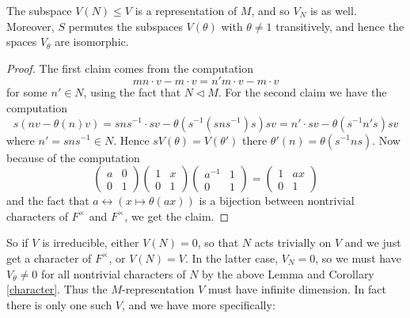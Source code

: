\begin{lemma}
	The subspace $V(N) \leq V$ is a representation of $M$, and so $V_N$ is as well. Moreover, $S$ permutes the subspaces $V(\theta)$ with $\theta \not= 1$ transitively, and hence the spaces $V_\theta$ are isomorphic.
\end{lemma}
\begin{proof}
	The first claim comes from the computation 
	$$mn\cdot v - m\cdot v = n'm\cdot v - m\cdot v$$ for some $n' \in N$, using the fact that $N \lhd M$. For the second claim we have the computation
	\[s(nv - \theta(n)v) = sns^{-1}\cdot sv - \theta (s^{-1}(sns^{-1})s)sv = n'\cdot sv - \theta(s^{-1}n's) sv\]
	where $n' = sns^{-1}\in N$. Hence $sV(\theta) = V(\theta')$ there $\theta'(n) = \theta(s^{-1}ns)$. Now because of the computation
	\[\begin{pmatrix}
		a & 0 \\ 0 & 1
	\end{pmatrix}\begin{pmatrix}
		1 & x \\ 0 & 1
	\end{pmatrix}\begin{pmatrix}
		a^{-1} & 1 \\ 0 & 1
	\end{pmatrix} = \begin{pmatrix}
		1 & ax \\ 0 & 1
	\end{pmatrix}\]
	and the fact that $a \leftrightarrow (x\mapsto\theta(ax))$ is a bijection between nontrivial characters of $F^\times$ and $F^\times$, we get the claim.
\end{proof}

So if $V$ is irreducible, either $V(N)=0$, so that $N$ acts trivially on $V$ and we just get a character of $F^\times$, or $V(N)=V$. In the latter case, $V_N=0$, so we must have $V_\theta \neq 0$ for all nontrivial characters of $N$ by the above Lemma and Corollary \ref{character}. Thus the $M$-representation $V$ must have infinite dimension. In fact there is only one such $V$, and we have more specifically:

